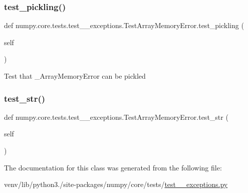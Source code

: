 \subsubsection{\texorpdfstring{test\+\_\+pickling()}{test\_pickling()}}
{\footnotesize\ttfamily def numpy.\+core.\+tests.\+test\+\_\+\+\_\+exceptions.\+Test\+Array\+Memory\+Error.\+test\+\_\+pickling (\begin{DoxyParamCaption}\item[{}]{self }\end{DoxyParamCaption})}

\begin{DoxyVerb}Test that _ArrayMemoryError can be pickled \end{DoxyVerb}
 \mbox{\label{classnumpy_1_1core_1_1tests_1_1test____exceptions_1_1TestArrayMemoryError_aad5aaa63d9131d8e0194d3f2c555d530}} 
\subsubsection{\texorpdfstring{test\+\_\+str()}{test\_str()}}
{\footnotesize\ttfamily def numpy.\+core.\+tests.\+test\+\_\+\+\_\+exceptions.\+Test\+Array\+Memory\+Error.\+test\+\_\+str (\begin{DoxyParamCaption}\item[{}]{self }\end{DoxyParamCaption})}



The documentation for this class was generated from the following file\+:\begin{DoxyCompactItemize}
\item 
venv/lib/python3./site-\/packages/numpy/core/tests/\hyperlink{test____exceptions_8py}{test\+\_\+\+\_\+exceptions.\+py}\end{DoxyCompactItemize}
